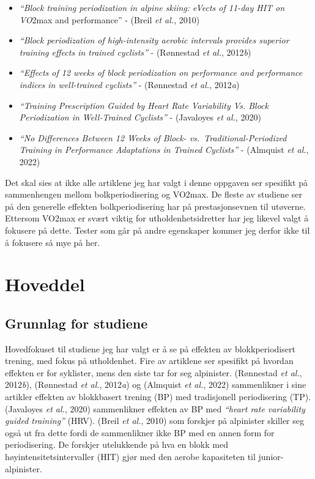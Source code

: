 \documentclass[
  letterpaper,
  DIV=11,
  numbers=noendperiod]{scrreprt}
\providecommand{\tightlist}{%
  \setlength{\itemsep}{0pt}\setlength{\parskip}{0pt}}\usepackage{longtable,booktabs,array}
\begin{document}
\begin{itemize}
\tightlist
\item
  \emph{``Block training periodization in alpine skiing: eVects of
  11-day HIT on VO}2max and performance'' - (Breil \emph{et al.}, 2010)
\item
  \emph{``Block periodization of high-intensity aerobic intervals
  provides superior training effects in trained cyclists''} - (Rønnestad
  \emph{et al.}, 2012\emph{b})
\item
  \emph{``Effects of 12 weeks of block periodization on performance and
  performance indices in well-trained cyclists''} - (Rønnestad \emph{et
  al.}, 2012\emph{a})
\item
  \emph{``Training Prescription Guided by Heart Rate Variability Vs.
  Block Periodization in Well-Trained Cyclists''} - (Javaloyes \emph{et
  al.}, 2020)
\item
  \emph{``No Differences Between 12 Weeks of Block-
  vs.~Traditional-Periodized Training in Performance Adaptations in
  Trained Cyclists''} - (Almquist \emph{et al.}, 2022)
\end{itemize}

Det skal sies at ikke alle artiklene jeg har valgt i denne oppgaven ser
spesifikt på sammenhengen mellom bolkperiodisering og VO2max. De fleste
av studiene ser på den generelle effekten bolkperiodisering har på
prestasjonsevnen til utøverne. Ettersom VO2max er svært viktig for
utholdenhetsidretter har jeg likevel valgt å fokusere på dette. Tester
som går på andre egenskaper kommer jeg derfor ikke til å fokusere så mye
på her.

\section{Hoveddel}\label{hoveddel}

\subsection{Grunnlag for studiene}\label{grunnlag-for-studiene}

Hovedfokuset til studiene jeg har valgt er å se på effekten av
blokkperiodisert trening, med fokus på utholdenhet. Fire av artiklene
ser spesifikt på hvordan effekten er for syklister, mens den siste tar
for seg alpinister. (Rønnestad \emph{et al.}, 2012\emph{b}), (Rønnestad
\emph{et al.}, 2012\emph{a}) og (Almquist \emph{et al.}, 2022)
sammenlikner i sine artikler effekten av blokkbasert trening (BP) med
tradisjonell periodisering (TP). (Javaloyes \emph{et al.}, 2020)
sammenlikner effekten av BP med \emph{``heart rate variability guided
training''} (HRV). (Breil \emph{et al.}, 2010) som forskjer på
alpinister skiller seg også ut fra dette fordi de sammenlikner ikke BP
med en annen form for periodisering. De forskjer utelukkende på hva en
blokk med høyintensitetsintervaller (HIT) gjør med den aerobe
kapasiteten til junior-alpinister.
\end{document}
